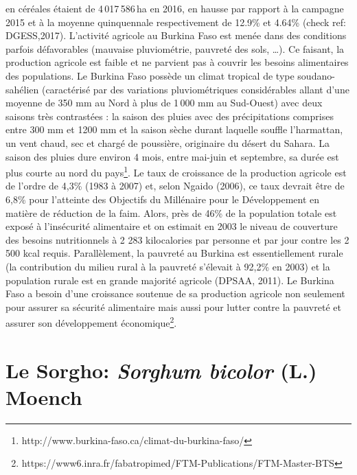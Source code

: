 \documentclass[a4paper,11pt]{article}
\begin{document}
en céréales étaient de 4\,017\,586\,ha en 2016, en hausse par rapport
à la campagne 2015 et à la moyenne quinquennale respectivement de
12.9\% et 4.64\% (check ref: DGESS,2017). L’activité agricole au
Burkina Faso est menée dans des conditions parfois défavorables
(mauvaise pluviométrie, pauvreté des sols, \ldots{}). Ce faisant, la
production agricole est faible et ne parvient pas à couvrir les
besoins alimentaires des populations. Le Burkina Faso possède un
climat tropical de type soudano-sahélien (caractérisé par des
variations pluviométriques considérables allant d’une moyenne de 350
mm au Nord à plus de 1\,000 mm au Sud-Ouest) avec deux saisons très
contrastées : la saison des pluies avec des précipitations comprises
entre 300 mm et 1200 mm et la saison sèche durant laquelle souffle
l’harmattan, un vent chaud, sec et chargé de poussière, originaire du
désert du Sahara. La saison des pluies dure environ 4 mois, entre
mai-juin et septembre, sa durée est plus courte au nord du
pays\footnote{http://www.burkina-faso.ca/climat-du-burkina-faso/}. Le
taux de croissance de la production agricole est de l’ordre de 4,3\%
(1983 à 2007) et, selon Ngaido (2006), ce taux devrait être de 6,8\%
pour l’atteinte des Objectifs du Millénaire pour le Développement en
matière de réduction de la faim. Alors, près de 46\% de la population
totale est exposé à l’insécurité alimentaire et on estimait en 2003 le
niveau de couverture des besoins nutritionnels à 2 283 kilocalories
par personne et par jour contre les 2\,500 kcal requis. Parallèlement,
la pauvreté au Burkina est essentiellement rurale (la contribution du
milieu rural à la pauvreté s’élevait à 92,2\% en 2003) et la
population rurale est en grande majorité agricole (DPSAA, 2011). Le
Burkina Faso a besoin d’une croissance soutenue de sa production
agricole non seulement pour assurer sa sécurité alimentaire mais aussi
pour lutter contre la pauvreté et assurer son développement
économique\footnote{https://www6.inra.fr/fabatropimed/FTM-Publications/FTM-Master-BTS}.

\section{Le Sorgho: \emph{Sorghum bicolor} (L.) Moench}


\end{document}
